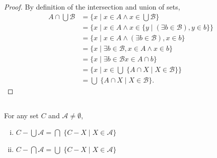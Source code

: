 \documentclass{report}
\begin{document}
\begin{proof}
      By definition of the intersection and union of sets,
        \begin{align*}
          A \cap \bigcup \mathscr{B}
            & = \{ x \mid x \in A \land x \in \bigcup \mathscr{B} \} \\
            & = \{ x \mid x \in A \land
              x \in \{ y \mid (\exists b \in \mathscr{B}), y \in b \}\} \\
            & = \{ x \mid x \in A \land (\exists b \in \mathscr{B}), x \in b \} \\
            & = \{ x \mid \exists b \in \mathscr{B}, x \in A \land x \in b \} \\
            & = \{ x \mid \exists b \in \mathscr{B} x \in A \cap b \} \\
            & = \{ x \mid
              x \in \bigcup\; \{ A \cap X \mid X \in \mathscr{B} \}\} \\
            & = \bigcup\; \{ A \cap X \mid X \in \mathscr{B} \}.
        \end{align*}

  \end{proof}

\subsection{}%

  For any set $C$ and $\mathscr{A} \neq \emptyset$,
    \begin{enumerate}[(i)]
      \item $C - \bigcup \mathscr{A} =
        \bigcap\; \{ C - X \mid X \in \mathscr{A} \}$
      \item $C - \bigcap \mathscr{A} =
        \bigcup\; \{ C - X \mid X \in \mathscr{A} \}$
    \end{enumerate}
\end{document}
